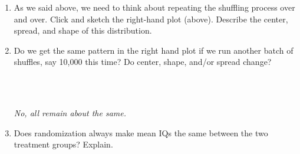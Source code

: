 \begin{enumerate}
 Again under the  menu, click 
 Click  several times.   Record
the difference in means for the first shuffle.\\

\item As we said above, we need to think about repeating the shuffling
  process over and over.  Click  and sketch the
  right-hand plot (above).  Describe the center,
  spread, and shape of this distribution.

\item Do we get the same pattern in the right hand plot if we run
  another batch of shuffles, say 10,000 this time?    Do
  center, shape, and/or spread change?
\begin{students}
        \vspace{2cm}\\
\end{students}
\begin{key}
  \\ {\it  No, all remain about the same.}
\end{key}


\item  Does randomization always make mean IQs the same
  between the two treatment groups? Explain. 
\begin{students}
 \vspace{3cm} 
\end{students}


\end{enumerate}
